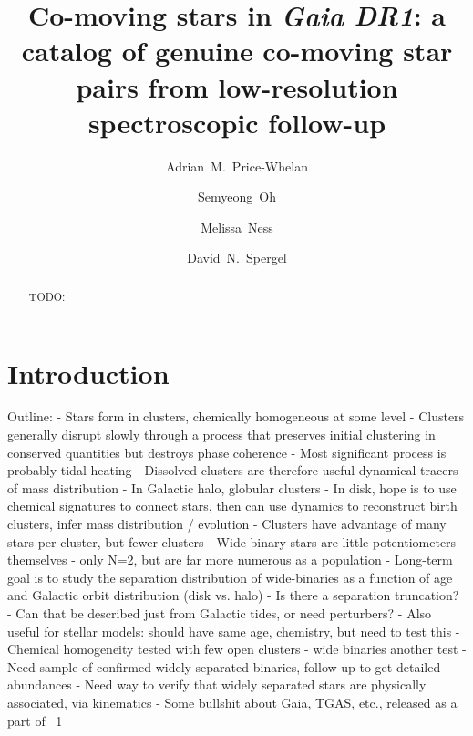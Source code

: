 \documentclass[modern, letterpaper]{aastex61}
\newcommand{\gaia}{\project{Gaia}}
\newcommand{\DR}[1]{\acronym{DR}1}
\begin{document}
\title{Co-moving stars in \textsl{Gaia DR1}:
       a catalog of genuine co-moving star pairs from low-resolution
       spectroscopic follow-up}

\author{Adrian~M.~Price-Whelan}

\author{Semyeong~Oh}

\author{Melissa~Ness}

\author{David~N.~Spergel}


\begin{abstract}
TODO:

\end{abstract}


\section{Introduction}\label{sec:introduction}

Outline:
- Stars form in clusters, chemically homogeneous at some level
- Clusters generally disrupt slowly through a process that preserves initial
  clustering in conserved quantities but destroys phase coherence
- Most significant process is probably tidal heating
- Dissolved clusters are therefore useful dynamical tracers of mass distribution
- In Galactic halo, globular clusters
- In disk, hope is to use chemical signatures to connect stars, then can use
  dynamics to reconstruct birth clusters, infer mass distribution / evolution
- Clusters have advantage of many stars per cluster, but fewer clusters
- Wide binary stars are little potentiometers themselves - only N=2, but are far
  more numerous as a population
- Long-term goal is to study the separation distribution of wide-binaries as a
  function of age and Galactic orbit distribution (disk vs. halo)
    - Is there a separation truncation?
    - Can that be described just from Galactic tides, or need perturbers?
- Also useful for stellar models: should have same age, chemistry, but need to
  test this
    - Chemical homogeneity tested with few open clusters - wide binaries another
      test
    - Need sample of confirmed widely-separated binaries, follow-up to get
      detailed abundances
    - Need way to verify that widely separated stars are physically associated,
      via kinematics
- Some bullshit about Gaia, TGAS, etc., released as a part of \gaia\ \DR{1}\
\end{document}
